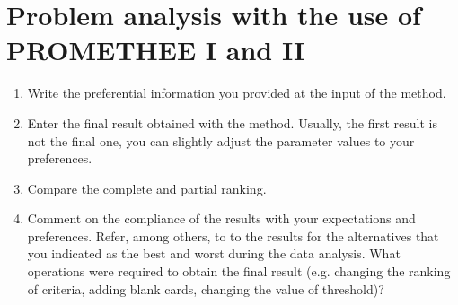 \documentclass{article}
\begin{document}


\section{Problem analysis with the use of PROMETHEE I and II}

\begin{enumerate}

    \item Write the preferential information you provided at the input of the method.

    \item Enter the final result obtained with the method. Usually, the first result is not the final one, you can
    slightly adjust the parameter values to your preferences.

    \item Compare the complete and partial ranking.

    \item Comment on the compliance of the results with your expectations and preferences. Refer, among
    others, to to the results for the alternatives that you indicated as the best and worst during the data
    analysis. What operations were required to obtain the final result (e.g. changing the ranking of criteria,
    adding blank cards, changing the value of threshold)?

\end{enumerate}
\end{document}
